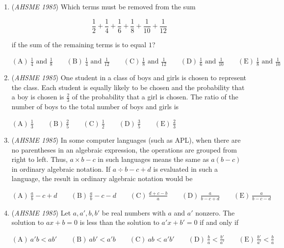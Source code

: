 \begin{enumerate}
 $\mathrm{(A)\ } \$306 \qquad \mathrm{(B) \ }  \$333 \qquad \mathrm{(C)\ } \$342 \qquad \mathrm{(D) \  }  \$348 \qquad \mathrm{(E) \  }  \$360$


	\item (\textit{AHSME 1985}) Which terms must be removed from the sum


 
 \[\frac{1}{2}+\frac{1}{4}+\frac{1}{6}+\frac{1}{8}+\frac{1}{10}+\frac{1}{12}\]


 if the sum of the remaining terms is to equal $1$?


 $\mathrm{(A)\ } \frac{1}{4}\text{ and }\frac{1}{8} \qquad \mathrm{(B) \ }\frac{1}{4}\text{ and }\frac{1}{12} \qquad \mathrm{(C) \  } \frac{1}{8}\text{ and }\frac{1}{12} \qquad \mathrm{(D) \  } \frac{1}{6}\text{ and }\frac{1}{10} \qquad \mathrm{(E) \  }\frac{1}{8}\text{ and }\frac{1}{10}$


	\item (\textit{AHSME 1985}) One student in a class of boys and girls is chosen to represent the class. Each student is equally likely to be chosen and the probability that a boy is chosen is $\frac{2}{3}$ of the probability that a girl is chosen. The ratio of the number of boys to the total number of boys and girls is


 $\mathrm{(A)\ } \frac{1}{3} \qquad \mathrm{(B) \ }\frac{2}{5} \qquad \mathrm{(C) \  } \frac{1}{2} \qquad \mathrm{(D) \  } \frac{3}{5} \qquad \mathrm{(E) \  }\frac{2}{3}$


	\item (\textit{AHSME 1985}) In some computer languages (such as APL), when there are no parentheses in an algebraic expression, the operations are grouped from right to left. Thus, $a \times b - c$ in such languages means the same as $a(b-c)$ in ordinary algebraic notation. If $a\div b-c+d$ is evaluated in such a language, the result in ordinary algebraic notation would be


 $\mathrm{(A)\ } \frac{a}{b}-c+d \qquad \mathrm{(B) \ }\frac{a}{b}-c-d \qquad \mathrm{(C) \  } \frac{d+c-b}{a} \qquad \mathrm{(D) \  } \frac{a}{b-c+d} \qquad \mathrm{(E) \  }\frac{a}{b-c-d}$


	\item (\textit{AHSME 1985}) Let $a,a',b,b'$ be real numbers with $a$ and $a'$ nonzero. The solution to $ax+b=0$ is less than the solution to $a'x+b'=0$ if and only if 


 $\mathrm{(A)\ } a'b < ab' \qquad \mathrm{(B) \ }ab' < a'b \qquad \mathrm{(C) \  } ab < a'b' \qquad \mathrm{(D) \  } \frac{b}{a} < \frac{b'}{a'} \qquad \mathrm{(E) \  }\frac{b'}{a'} < \frac{b}{a}$



\end{enumerate}
